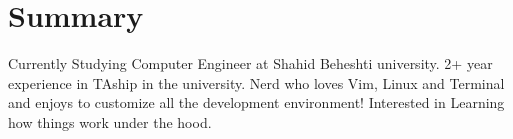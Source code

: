 \section{Summary}\closesection{}
Currently Studying Computer Engineer at Shahid Beheshti university.
2+ year experience in TAship in the university.
Nerd who loves Vim, Linux and Terminal and enjoys to customize all the development environment!
Interested in Learning how things work under the hood.

